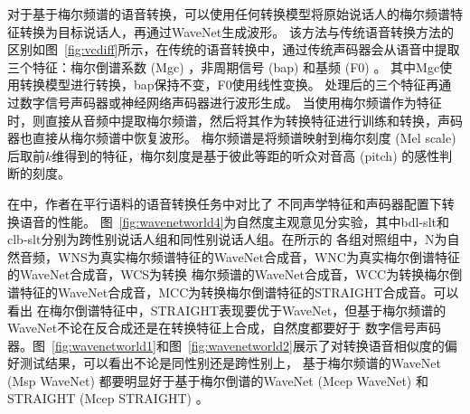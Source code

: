 对于基于梅尔频谱的语音转换，可以使用任何转换模型将原始说话人的梅尔频谱特征转换为目标说话人，再通过WaveNet生成波形。
该方法与传统语音转换方法的区别如图~\ref{fig:vcdiff}所示，在传统的语音转换中，通过传统声码器会从语音中提取三个特征：梅尔倒谱系数 (Mgc) ，非周期信号 (bap) 和基频 (F0) 。
其中Mgc使用转换模型进行转换，bap保持不变，F0使用线性变换。
处理后的三个特征再通过数字信号声码器或神经网络声码器进行波形生成。
当使用梅尔频谱作为特征时，则直接从音频中提取梅尔频谱，然后将其作为转换特征进行训练和转换，声码器也直接从梅尔频谱中恢复波形。
梅尔频谱是将频谱映射到梅尔刻度 (Mel scale) 后取前$k$维得到的特征，梅尔刻度是基于彼此等距的听众对音高 (pitch) 的感性判断的刻度。

在\cite{chen2018high}中，作者在平行语料的语音转换任务中对比了
不同声学特征和声码器配置下转换语音的性能。
图~\ref{fig:wavenetworld4}为自然度主观意见分实验，其中bdl-slt和clb-slt分别为跨性别说话人组和同性别说话人组。在所示的
各组对照组中，N为自然音频，WNS为真实梅尔频谱特征的WaveNet合成音，WNC为真实梅尔倒谱特征的WaveNet合成音，WCS为转换
梅尔频谱的WaveNet合成音，WCC为转换梅尔倒谱特征的WaveNet合成音，MCC为转换梅尔倒谱特征的STRAIGHT合成音。可以看出
在梅尔倒谱特征中，STRAIGHT表现要优于WaveNet，但基于梅尔频谱的WaveNet不论在反合成还是在转换特征上合成，自然度都要好于
数字信号声码器。图~\ref{fig:wavenetworld1}和图~\ref{fig:wavenetworld2}展示了对转换语音相似度的偏好测试结果，可以看出不论是同性别还是跨性别上，
基于梅尔频谱的WaveNet (Msp WaveNet) 都要明显好于基于梅尔倒谱的WaveNet (Mcep WaveNet) 和STRAIGHT (Mcep STRAIGHT) 。





